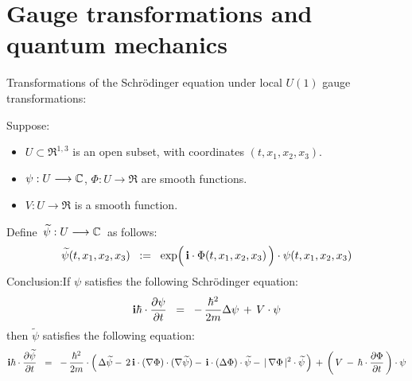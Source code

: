 

\section{Gauge transformations and quantum mechanics}
\setcounter{theorem}{0}
\setcounter{equation}{0}


\renewcommand{\theenumi}{\roman{enumi}}
\renewcommand{\labelenumi}{\textnormal{(\theenumi)}$\;\;$}


Transformations of the Schr\"{o}dinger equation under local $U(1)$ gauge transformations:
\begin{proposition}
\mbox{}
\vskip 0.2cm
\noindent
Suppose:
\begin{itemize}
\item
	$U \subset \Re^{1,3}$ is an open subset, with coordinates $(t,x_{1},x_{2},x_{3})$.
\item
	$\psi : U \longrightarrow \mathbb{C}$, $\Phi : U \longrightarrow \Re$ are smooth functions.
\item
	$V : U \longrightarrow \Re$ is a smooth function.
\end{itemize}
Define \,$\widetilde{\psi} : U \longrightarrow \mathbb{C}$\, as follows:
\begin{equation*}
\widetilde{\psi}(t,x_{1},x_{2},x_{3})
\;\; := \;\;
	\exp\!\left(\,\overset{{\color{white}.}}{\i}\cdot\Phi(t,x_{1},x_{2},x_{3})\,\right) \cdot \psi(t,x_{1},x_{2},x_{3})
\end{equation*}
Conclusion:\quad If $\psi$ satisfies the following Schr\"{o}dinger equation:
\begin{equation*}
\textnormal{\bf i}\hbar \cdot \dfrac{\partial \psi}{\partial t}
\;\; = \;\;
	-\,\dfrac{\hbar^{2}}{2m}\Delta\psi \,+\, V\cdot\psi
\end{equation*}
then $\widetilde{\psi}$ satisfies the following equation:
\begin{equation*}
\textnormal{\bf i}\hbar \cdot \dfrac{\partial \widetilde{\psi}}{\partial t}
\;\; = \;\;
	-\,\dfrac{\hbar^{2}}{2m}\cdot\left(\,
		\Delta\widetilde{\psi}
		-\,2\,\textnormal{\bf i}\cdot(\nabla\Phi) \cdot (\nabla\widetilde{\psi})
		-\,\textnormal{\bf i}\cdot(\Delta\Phi)\cdot\widetilde{\psi}
		-\,\vert\,\nabla\Phi\,\vert^{2}\cdot\widetilde{\psi}
		\,\right)
	\,+\,
	\left(\,V\,-\,\hbar\cdot\dfrac{\partial\Phi}{\partial t}\,\right)\cdot\psi
\end{equation*}
\end{proposition}

